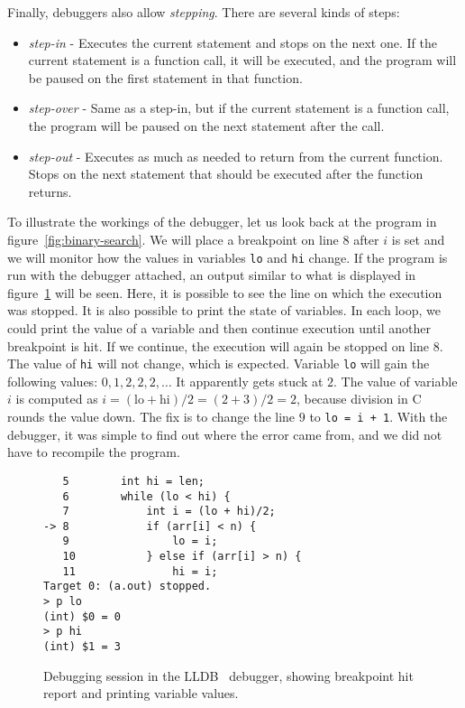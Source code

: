 Finally, debuggers also allow \textit{stepping}. There are several kinds of
steps:
\begin{itemize}
    \item \textit{step-in} - Executes the current statement and stops on the
        next one. If the current statement is a function call, it will be
        executed, and the program will be paused on the first statement in that
        function.
    \item \textit{step-over} - Same as a step-in, but if the current statement
        is a function call, the program will be paused on the next statement
        after the call.
    \item \textit{step-out} - Executes as much as needed to return from the
        current function. Stops on the next statement that should be executed
        after the function returns.
\end{itemize}

To illustrate the workings of the debugger, let us look back at the program in
figure~\ref{fig:binary-search}. We will place a breakpoint on line $8$ after
$i$ is set and we will monitor how the values in variables \texttt{lo} and
\texttt{hi} change. If the program is run with the debugger attached, an output
similar to what is displayed in figure~\ref{fig:lldb-debug1} will be seen.
Here, it is possible to see the line on which the execution was stopped. It is
also possible to print the state of variables. In each loop, we could print the
value of a variable and then continue execution until another breakpoint is
hit. If we continue, the execution will again be stopped on line $8$. The value
of \texttt{hi} will not change, which is expected. Variable \texttt{lo} will
gain the following values: $0, 1, 2, 2, 2, \dots$ It apparently gets stuck at
$2$. The value of variable $i$ is computed as $i = (\text{lo} + \text{hi})/2 =
(2 + 3)/2 = 2$, because division in C rounds the value down. The fix is to
change the line $9$ to \texttt{lo = i + 1}. With the debugger, it was simple to
find out where the error came from, and we did not have to recompile the
program.

\begin{figure}
\begin{verbatim}
   5   	    int hi = len;
   6   	    while (lo < hi) {
   7   	        int i = (lo + hi)/2;
-> 8   	        if (arr[i] < n) {
   9   	            lo = i;
   10  	        } else if (arr[i] > n) {
   11  	            hi = i;
Target 0: (a.out) stopped.
> p lo
(int) $0 = 0
> p hi
(int) $1 = 3
\end{verbatim}
    \caption{Debugging session in the LLDB~\cite{lldb} debugger, showing
    breakpoint hit report and printing variable values.}
    \label{fig:lldb-debug1}
\end{figure}

